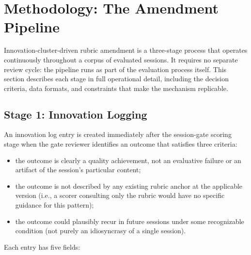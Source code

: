 
\section{Methodology: The Amendment Pipeline}
\label{sec:methodology}

Innovation-cluster-driven rubric amendment is a three-stage process that operates
continuously throughout a corpus of evaluated sessions. It requires no separate
review cycle: the pipeline runs as part of the evaluation process itself. This
section describes each stage in full operational detail, including the
decision criteria, data formats, and constraints that make the mechanism
replicable.

\subsection{Stage 1: Innovation Logging}

An innovation log entry is created immediately after the session-gate scoring
stage when the gate reviewer identifies an outcome that satisfies three criteria:

\begin{itemize}
  \item the outcome is clearly a quality achievement, not an evaluative failure
        or an artifact of the session's particular content;
  \item the outcome is not described by any existing rubric anchor at the
        applicable version (i.e., a scorer consulting only the rubric would have
        no specific guidance for this pattern);
  \item the outcome could plausibly recur in future sessions under some
        recognizable condition (not purely an idiosyncrasy of a single session).
\end{itemize}

Each entry has five fields:

